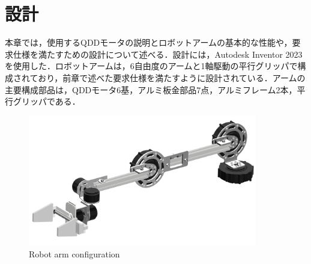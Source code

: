 \chapter{設計}
\label{chap:third}
%
本章では，使用するQDDモータの説明とロボットアームの基本的な性能や，要求仕様を満たすための設計について述べる．設計には，Autodesk Inventor 2023を使用した．ロボットアームは，6自由度のアームと1軸駆動の平行グリッパで構成されており，前章で述べた要求仕様を満たすように設計されている．アームの主要構成部品は，QDDモータ6基，アルミ板金部品7点，アルミフレーム2本，平行グリッパである．
\begin{figure}[h]
  \centering
  \includegraphics[width=10cm]{images/arm_design.png}
  \caption{Robot arm configuration}
  \label{fig:arm_design}
\end{figure}
\newpage





%